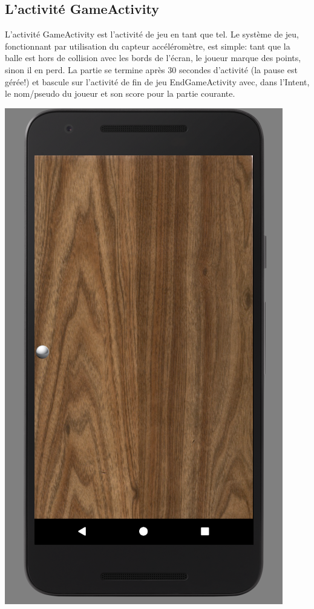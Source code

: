 \documentclass{article}
\begin{document}
\subsection{L'activité GameActivity}
L'activité GameActivity est l'activité de jeu en tant que tel. Le système de jeu, fonctionnant par utilisation du capteur accéléromètre, est simple: tant que la balle est hors de collision avec les bords de l'écran, le joueur marque des points, sinon il en perd. La partie se termine après 30 secondes d'activité (la pause est gérée!) et bascule sur l'activité de fin de jeu EndGameActivity avec, dans l'Intent, le nom/pseudo du joueur et son score pour la partie courante.
\begin{center}
  \includegraphics[scale=0.5]{GameActivity.png}
\end{center}
\end{document}
